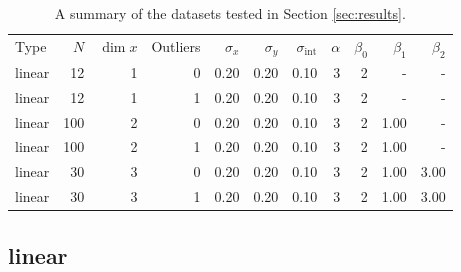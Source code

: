 \begin{table*}
	\centering
	\caption{A summary of the datasets tested in Section \ref{sec:results}.}
	\label{tab:results.datasets}
    \begin{tabular}{lrrrrrrrrrr}
Type & $N$ & $\dim x$ & Outliers & $\sigma_{x}$ & $\sigma_{y}$ & $\sigma_{\text{int}}$ & $\alpha$ & $\beta_0$ & $\beta_1$ & $\beta_2$ \\
linear & 12 & 1 & 0 & 0.20 & 0.20 & 0.10 & 3 & 2 & - & - \\
linear & 12 & 1 & 1 & 0.20 & 0.20 & 0.10 & 3 & 2 & - & - \\
linear & 100 & 2 & 0 & 0.20 & 0.20 & 0.10 & 3 & 2 & 1.00 & - \\
linear & 100 & 2 & 1 & 0.20 & 0.20 & 0.10 & 3 & 2 & 1.00 & - \\
linear & 30 & 3 & 0 & 0.20 & 0.20 & 0.10 & 3 & 2 & 1.00 & 3.00 \\
linear & 30 & 3 & 1 & 0.20 & 0.20 & 0.10 & 3 & 2 & 1.00 & 3.00 \\
\end{tabular}

\end{table*}


\subsection{ linear }








